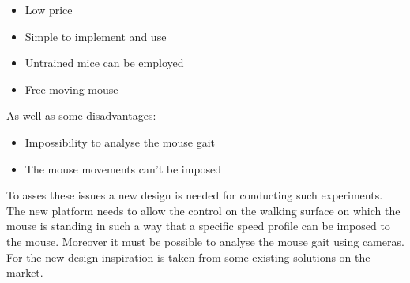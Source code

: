 \documentclass[12pt,a4paper, twoside]{article}
\begin{document}
\begin{itemize}
	\item Low price
	\item Simple to implement and use
	\item Untrained mice can be employed
	\item Free moving mouse
\end{itemize}
As well as some disadvantages:
\begin{itemize}
	\item Impossibility to analyse the mouse gait
	\item The mouse movements can't be imposed
\end{itemize}
To asses these issues a new design is needed for conducting such experiments. The new platform needs to allow the control on the walking surface on which the mouse is standing in such a way that a specific speed profile can be imposed to the mouse. Moreover it must be possible to analyse the mouse gait using cameras. \\
For the new design inspiration is taken from some existing solutions on the market. 
\end{document}
